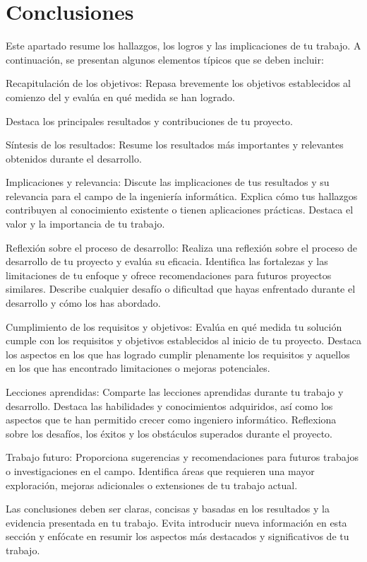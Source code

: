 \chapter{Conclusiones}\label{ch:chapter_5}


Este apartado resume los hallazgos, los logros y las implicaciones de tu trabajo.
A continuación, se presentan algunos elementos típicos que se deben incluir:

Recapitulación de los objetivos: Repasa brevemente los objetivos establecidos al comienzo del y evalúa en qué medida se
han logrado.

Destaca los principales resultados y contribuciones de tu proyecto.

Síntesis de los resultados: Resume los resultados más importantes y relevantes obtenidos durante el desarrollo.

Implicaciones y relevancia: Discute las implicaciones de tus resultados y su relevancia para el campo
de la ingeniería informática.
Explica cómo tus hallazgos contribuyen al conocimiento existente o tienen aplicaciones prácticas.
Destaca el valor y la importancia de tu trabajo.

Reflexión sobre el proceso de desarrollo: Realiza una reflexión sobre el proceso de desarrollo de tu proyecto y evalúa
su eficacia.
Identifica las fortalezas y las limitaciones de tu enfoque y ofrece recomendaciones para futuros proyectos similares.
Describe cualquier desafío o dificultad que hayas enfrentado durante el desarrollo y cómo los has abordado.

Cumplimiento de los requisitos y objetivos: Evalúa en qué medida tu solución cumple con los requisitos y objetivos
establecidos al inicio de tu proyecto.
Destaca los aspectos en los que has logrado cumplir plenamente los requisitos y aquellos en los que has encontrado
limitaciones o mejoras potenciales.

Lecciones aprendidas: Comparte las lecciones aprendidas durante tu trabajo y desarrollo.
Destaca las habilidades y conocimientos adquiridos, así como los aspectos que te han permitido crecer como ingeniero
informático.
Reflexiona sobre los desafíos, los éxitos y los obstáculos superados durante el proyecto.

Trabajo futuro: Proporciona sugerencias y recomendaciones para futuros trabajos o investigaciones en el campo.
Identifica áreas que requieren una mayor exploración, mejoras adicionales o extensiones de tu trabajo actual.

Las conclusiones deben ser claras, concisas y basadas en los resultados y la evidencia presentada en tu trabajo.
Evita introducir nueva información en esta sección y enfócate en
resumir los aspectos más destacados y significativos de tu trabajo.


